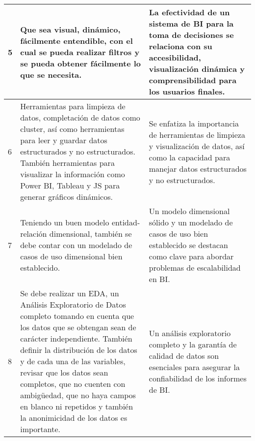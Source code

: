 \begin{longtable}{|l|p{5cm}|p{5cm}|}
    5                                                 & Que sea visual, dinámico, fácilmente entendible, con el cual se pueda realizar filtros y se pueda obtener fácilmente lo que se necesita.                                                                                                                                                                                                                                                              & La efectividad de un sistema de BI para la toma de decisiones se relaciona con su accesibilidad, visualización dinámica y comprensibilidad para los usuarios finales.                                                 \\\hline
    6                                                 & Herramientas para limpieza de datos, completación de datos como cluster, así como herramientas para leer y guardar datos estructurados y no estructurados. También herramientas para visualizar la información como Power BI, Tableau y JS para generar gráficos dinámicos.                                                                                                                           & Se enfatiza la importancia de herramientas de limpieza y visualización de datos, así como la capacidad para manejar datos estructurados y no estructurados.                                                           \\\hline
    7                                                 & Teniendo un buen modelo entidad-relación dimensional, también se debe contar con un modelado de casos de uso dimensional bien establecido.                                                                                                                                                                                                                                                            & Un modelo dimensional sólido y un modelado de casos de uso bien establecido se destacan como clave para abordar problemas de escalabilidad en BI.                                                                     \\\hline
    8                                                 & Se debe realizar un EDA, un Análisis Exploratorio de Datos completo tomando en cuenta que los datos que se obtengan sean de carácter independiente. También definir la distribución de los datos y de cada una de las variables, revisar que los datos sean completos, que no cuenten con ambigüedad, que no haya campos en blanco ni repetidos y también la anonimicidad de los datos es importante. & Un análisis exploratorio completo y la garantía de calidad de datos son esenciales para asegurar la confiabilidad de los informes de BI.                                                                              \\\hline

\end{longtable}
